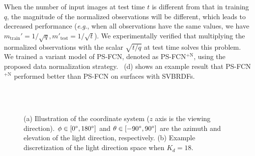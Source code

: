 \documentclass[10pt,journal,compsoc]{IEEEtran}
\newcommand{\eg}{\textit{e}.\textit{g}.}
\begin{document}
When the number of input images at test time $t$ is different from that in training $q$, the magnitude of the normalized observations will be different, which leads to decreased performance (\eg, when all observations have the same values, 
we have $m_{\text{train}}' = 1/\sqrt{q}, m'_{\text{test}}=1/\sqrt{t}$). 
We experimentally verified that multiplying the normalized observations with the scalar $\sqrt{t/q}$ at test time solves this problem.
We trained a variant model of PS-FCN, denoted as PS-FCN$^\text{+N}$, using the proposed data normalization strategy.
~(d) shows an example result that PS-FCN$^\text{+N}$ performed better than PS-FCN on surfaces with SVBRDFs.

\begin{figure} \centering
    
     \\ 
    \vspace{-0.9em}   \\
    \caption{(a) Illustration of the coordinate system ($z$ axis is the viewing direction). $\phi \in [0\degree, 180\degree]$ and $\theta \in [-90\degree, 90\degree]$ are the azimuth and elevation of the light direction, respectively. (b) Example discretization of the light direction space when $K_d=18$.} \label{fig:coord}
\end{figure}
\end{document}
